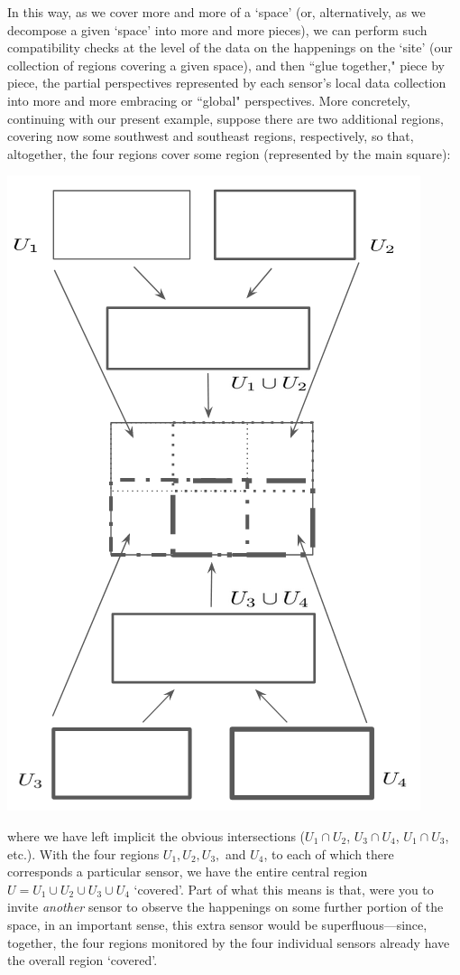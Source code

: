 \documentclass[a4paper]{book}
\theoremstyle{definition}
\theoremstyle{definition}
\theoremstyle{definition}
\theoremstyle{theorem}
\theoremstyle{definition}
\begin{document}
	In this way, as we cover more and more of a `space' (or, alternatively, as we decompose a given `space' into more and more pieces), we can perform such compatibility checks at the level of the data on the happenings on the `site' (our collection of regions covering a given space), and then ``glue together," piece by piece, the partial perspectives represented by each sensor's local data collection into more and more embracing or ``global" perspectives. More concretely, continuing with our present example, suppose there are two additional regions, covering now some southwest and southeast regions, respectively, so that, altogether, the four regions cover some region (represented by the main square):  
	\begin{center}
		\includegraphics[scale=0.25]{SpaceUnion.png}
	\end{center} 
	where we have left implicit the obvious intersections ($U_1 \cap U_2$, $U_3 \cap U_4$, $U_1 \cap U_3$, etc.). With the four regions $U_1, U_2, U_3,$ and $U_4$, to each of which there corresponds a particular sensor, we have the entire central region $U = U_1 \cup U_2 \cup U_3 \cup U_4$ `covered'. Part of what this means is that, were you to invite \textit{another} sensor to observe the happenings on some further portion of the space, in an important sense, this extra sensor would be superfluous---since, together, the four regions monitored by the four individual sensors already have the overall region `covered'. \par 
\end{document}
